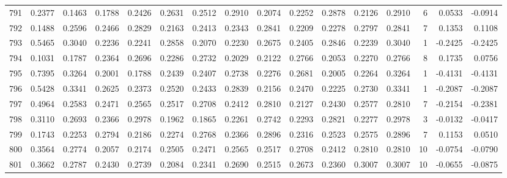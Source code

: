 \begin{tabular}{lrrrrrrrrrrrrrrr}
791 &      0.2377 &  0.1463 &  0.1788 &  0.2426 &  0.2631 &  0.2512 &  0.2910 &  0.2074 &  0.2252 &  0.2878 &   0.2126 &     0.2910 &      6 &                    0.0533 &                    -0.0914 \\
792 &      0.1488 &  0.2596 &  0.2466 &  0.2829 &  0.2163 &  0.2413 &  0.2343 &  0.2841 &  0.2209 &  0.2278 &   0.2797 &     0.2841 &      7 &                    0.1353 &                     0.1108 \\
793 &      0.5465 &  0.3040 &  0.2236 &  0.2241 &  0.2858 &  0.2070 &  0.2230 &  0.2675 &  0.2405 &  0.2846 &   0.2239 &     0.3040 &      1 &                   -0.2425 &                    -0.2425 \\
794 &      0.1031 &  0.1787 &  0.2364 &  0.2696 &  0.2286 &  0.2732 &  0.2029 &  0.2122 &  0.2766 &  0.2053 &   0.2270 &     0.2766 &      8 &                    0.1735 &                     0.0756 \\
795 &      0.7395 &  0.3264 &  0.2001 &  0.1788 &  0.2439 &  0.2407 &  0.2738 &  0.2276 &  0.2681 &  0.2005 &   0.2264 &     0.3264 &      1 &                   -0.4131 &                    -0.4131 \\
796 &      0.5428 &  0.3341 &  0.2625 &  0.2373 &  0.2520 &  0.2433 &  0.2839 &  0.2156 &  0.2470 &  0.2225 &   0.2730 &     0.3341 &      1 &                   -0.2087 &                    -0.2087 \\
797 &      0.4964 &  0.2583 &  0.2471 &  0.2565 &  0.2517 &  0.2708 &  0.2412 &  0.2810 &  0.2127 &  0.2430 &   0.2577 &     0.2810 &      7 &                   -0.2154 &                    -0.2381 \\
798 &      0.3110 &  0.2693 &  0.2366 &  0.2978 &  0.1962 &  0.1865 &  0.2261 &  0.2742 &  0.2293 &  0.2821 &   0.2277 &     0.2978 &      3 &                   -0.0132 &                    -0.0417 \\
799 &      0.1743 &  0.2253 &  0.2794 &  0.2186 &  0.2274 &  0.2768 &  0.2366 &  0.2896 &  0.2316 &  0.2523 &   0.2575 &     0.2896 &      7 &                    0.1153 &                     0.0510 \\
800 &      0.3564 &  0.2774 &  0.2057 &  0.2174 &  0.2505 &  0.2471 &  0.2565 &  0.2517 &  0.2708 &  0.2412 &   0.2810 &     0.2810 &     10 &                   -0.0754 &                    -0.0790 \\
801 &      0.3662 &  0.2787 &  0.2430 &  0.2739 &  0.2084 &  0.2341 &  0.2690 &  0.2515 &  0.2673 &  0.2360 &   0.3007 &     0.3007 &     10 &                   -0.0655 &                    -0.0875 \\

\end{tabular}
